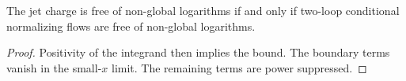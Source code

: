 \begin{corollary}\label{thm:3}
The jet charge is free of non-global logarithms if and only if two-loop
conditional normalizing flows are free of non-global logarithms.
\end{corollary}

\begin{proof}
Positivity of the integrand then implies the bound. The boundary terms
vanish in the small-$x$ limit. The remaining terms are power suppressed.
\end{proof}

